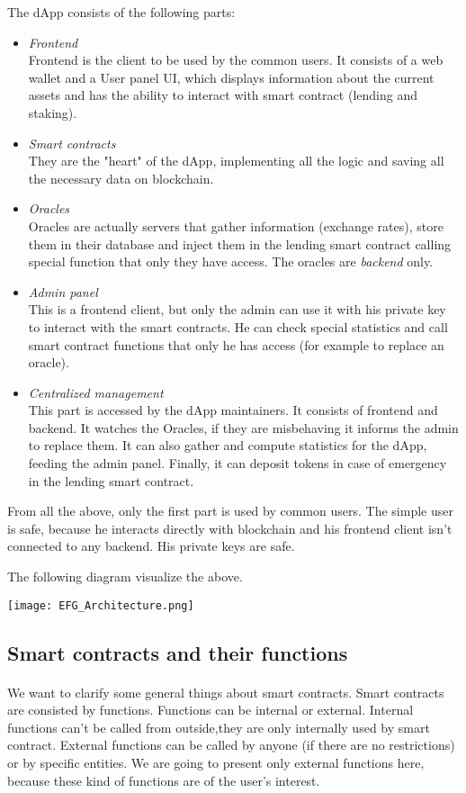 \documentclass{article}
\begin{document}
The dApp consists of the following parts:
\begin{itemize}
\item \emph{Frontend} \\
Frontend is the client to be used by the common users. It consists of a web wallet and a User panel UI, which displays information about the current assets and has the ability to interact with smart contract (lending and staking).
\item \emph{Smart contracts} \\
They are the "heart" of the dApp, implementing all the logic and saving all the necessary data on blockchain.
\item \emph{Oracles} \\
Oracles are actually servers that gather information (exchange rates), store them in their database and inject them in the lending smart contract calling special function that only they have access. The oracles are \emph{backend} only.
\item \emph{Admin panel} \\
This is a frontend client, but only the admin can use it with his private key to interact with the smart contracts. He can check special statistics and call smart contract functions that only he has access (for example to replace an oracle). 
\item \emph{Centralized management} \\
This part is accessed by the dApp maintainers. It consists of frontend and backend. It watches the Oracles, if they are misbehaving it informs the admin to replace them. It can also gather and compute statistics for the dApp, feeding the admin panel. Finally, it can deposit tokens in case of emergency in the lending smart contract.
\end{itemize}
From all the above, only the first part is used by common users. The simple user is safe, because he interacts directly with blockchain and his frontend client isn't connected to any backend. His private keys are safe.

The following diagram visualize the above.

\texttt{[image: EFG\_Architecture.png]}
\subsection{Smart contracts and their functions}
\paragraph{ }
We want to clarify some general things about smart contracts. Smart contracts are consisted by functions. 
Functions can be internal or external. Internal functions can't be called from outside,they are only internally used by smart contract. External functions can be called by anyone (if there are no restrictions) or by specific entities. We are going to present only external functions here, because these kind of functions are of the user's interest. 
\end{document}

